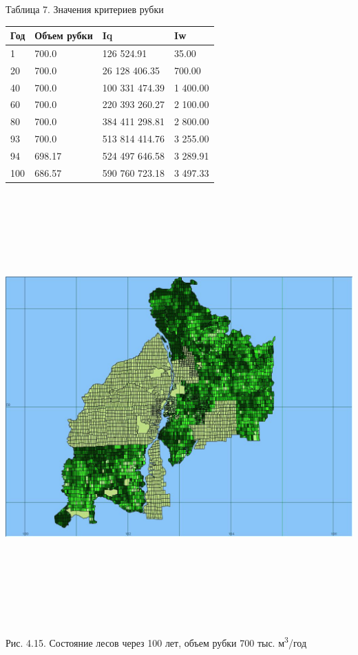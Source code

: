 \documentclass{article}
\begin{document}
\begin{flushright}
Таблица 7. Значения критериев рубки

\begin{tabular}{|>{\raggedright}p{38pt}|>{\raggedright}p{88pt}|>{\raggedright}p{132pt}|>{\raggedright}p{132pt}|}
\hline
Год & Объем рубки & Iq & Iw\tabularnewline
\hline
1 & 700.0 & 126 524.91 & 35.00\tabularnewline
\hline
20 & 700.0 & 26 128 406.35 & 700.00\tabularnewline
\hline
40 & 700.0 & 100 331 474.39 & 1 400.00\tabularnewline
\hline
60 & 700.0 & 220 393 260.27 & 2 100.00\tabularnewline
\hline
80 & 700.0 & 384 411 298.81 & 2 800.00\tabularnewline
\hline
93 & 700.0 & 513 814 414.76 & 3 255.00\tabularnewline
\hline
94 & 698.17 & 524 497 646.58 & 3 289.91\tabularnewline
\hline
100 & 686.57 & 590 760 723.18 & 3 497.33\tabularnewline
\hline
\end{tabular}
\end{flushright}

\begin{center}
\includegraphics[width=622pt, height=467pt, keepaspectratio=true]{asyaDisser9_3-fig026.png}

Рис. 4.15. Состояние лесов через 100 лет, объем рубки 
700 тыс. м\textsuperscript{3}/год
\end{center}
\end{document}
